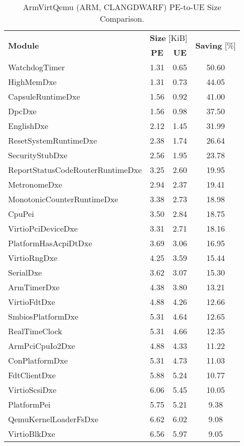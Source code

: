 \begin{longtable}{l c c c}
  \caption{ArmVirtQemu (ARM, CLANGDWARF) PE-to-UE Size Comparison.}\\\\
  \toprule
  \multirow{2}{*}[-2pt]{\textbf{Module}} & \multicolumn{2}{c}{\textbf{Size} [KiB]} & \multirow{2}{*}[-2pt]{\textbf{Saving} [\%]}\\
  \cmidrule{2-3}
  & \textbf{PE} & \textbf{UE} &\\
  \midrule
  WatchdogTimer & 1.31 & 0.65 & 50.60\\
  HighMemDxe & 1.31 & 0.73 & 44.05\\
  CapsuleRuntimeDxe & 1.56 & 0.92 & 41.00\\
  DpcDxe & 1.56 & 0.98 & 37.50\\
  EnglishDxe & 2.12 & 1.45 & 31.99\\
  ResetSystemRuntimeDxe & 2.38 & 1.74 & 26.64\\
  SecurityStubDxe & 2.56 & 1.95 & 23.78\\
  ReportStatusCodeRouterRuntimeDxe & 3.25 & 2.60 & 19.95\\
  MetronomeDxe & 2.94 & 2.37 & 19.41\\
  MonotonicCounterRuntimeDxe & 3.38 & 2.73 & 18.98\\
  CpuPei & 3.50 & 2.84 & 18.75\\
  VirtioPciDeviceDxe & 3.31 & 2.71 & 18.16\\
  PlatformHasAcpiDtDxe & 3.69 & 3.06 & 16.95\\
  VirtioRngDxe & 4.25 & 3.59 & 15.44\\
  SerialDxe & 3.62 & 3.07 & 15.30\\
  ArmTimerDxe & 4.38 & 3.80 & 13.21\\
  VirtioFdtDxe & 4.88 & 4.26 & 12.66\\
  SmbiosPlatformDxe & 5.31 & 4.64 & 12.65\\
  RealTimeClock & 5.31 & 4.66 & 12.35\\
  ArmPciCpuIo2Dxe & 4.88 & 4.33 & 11.22\\
  ConPlatformDxe & 5.31 & 4.73 & 11.03\\
  FdtClientDxe & 5.88 & 5.24 & 10.77\\
  VirtioScsiDxe & 6.06 & 5.45 & 10.05\\
  PlatformPei & 5.75 & 5.21 & 9.38\\
  QemuKernelLoaderFsDxe & 6.62 & 6.02 & 9.08\\
  VirtioBlkDxe & 6.56 & 5.97 & 9.05\\

\end{longtable}
